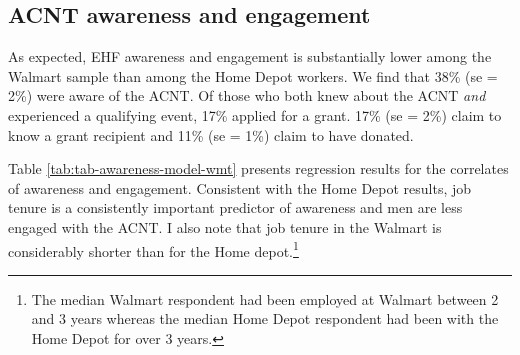 \documentclass[
  11pt,
  oneside]{article}
\begin{document}
\subsection{ACNT awareness and engagement}\label{acnt-awareness-and-engagement}

As expected, EHF awareness and engagement is substantially lower among the Walmart sample than among the Home Depot workers. We find that 38\% (se = 2\%) were aware of the ACNT. Of those who both knew about the ACNT \emph{and} experienced a qualifying event, 17\% applied for a grant. 17\% (se = 2\%) claim to know a grant recipient and 11\% (se = 1\%) claim to have donated.

Table \ref{tab:tab-awareness-model-wmt} presents regression results for the correlates of awareness and engagement. Consistent with the Home Depot results, job tenure is a consistently important predictor of awareness and men are less engaged with the ACNT. I also note that job tenure in the Walmart is considerably shorter than for the Home depot.\footnote{The median Walmart respondent had been employed at Walmart between 2 and 3 years whereas the median Home Depot respondent had been with the Home Depot for over 3 years.}
\end{document}
